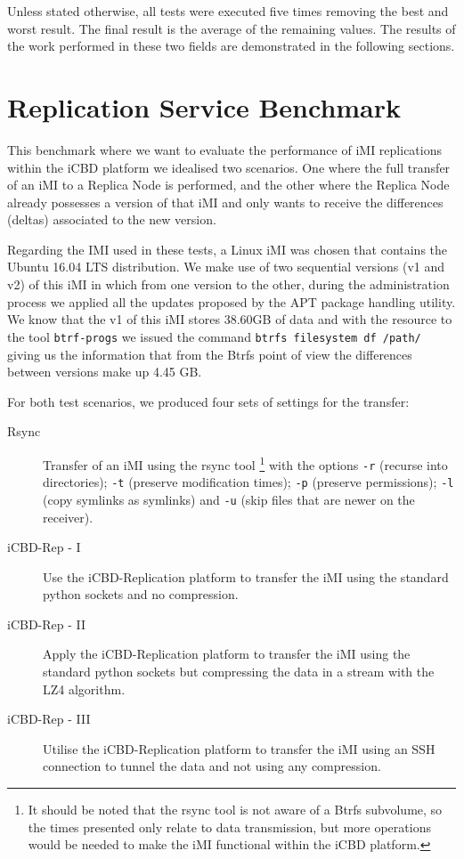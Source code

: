Unless stated otherwise, all tests were executed five times removing the best and worst result. The final result is the average of the remaining values. The results of the work performed in these two fields are demonstrated in the following sections.


\section{Replication Service Benchmark}
\label{sec:eval_rep_bench}

This benchmark where we want to evaluate the performance of iMI replications within the iCBD platform we idealised two scenarios. One where the full transfer of an iMI to a Replica Node is performed, and the other where the Replica Node already possesses a version of that iMI and only wants to receive the differences (deltas) associated to the new version.

Regarding the IMI used in these tests, a Linux iMI was chosen that contains the Ubuntu 16.04 LTS distribution.  We make use of two sequential versions (v1 and v2) of this iMI in which from one version to the other, during the administration process we applied all the updates proposed by the APT package handling utility. 
We know that the v1 of this iMI stores 38.60GB of data and with the resource to the tool \texttt{btrf-progs} we issued the command \texttt{btrfs filesystem df /path/} giving us the information that from the Btrfs point of view the differences between versions make up 4.45 GB.

For both test scenarios, we produced four sets of settings for the transfer:

\begin{description}
	\item [Rsync] Transfer of an iMI using the rsync tool \footnote{It should be noted that the rsync tool is not aware of a Btrfs subvolume, so the times presented only relate to data transmission, but more operations would be needed to make the iMI functional within the iCBD platform.} with the options \texttt{-r} (recurse into directories); \texttt{-t} (preserve modification times); \texttt{-p} (preserve permissions); \texttt{-l} (copy symlinks as symlinks) and \texttt{-u} (skip files that are newer on the receiver).
	\item [iCBD-Rep - I] Use the iCBD-Replication platform to transfer the iMI using the standard python sockets and no compression.
	\item [iCBD-Rep - II] Apply the iCBD-Replication platform to transfer the iMI using the standard python sockets but compressing the data in a stream with the LZ4 algorithm.
	\item [iCBD-Rep - III] Utilise the iCBD-Replication platform to transfer the iMI using an SSH connection to tunnel the data and not using any compression.
\end{description}

